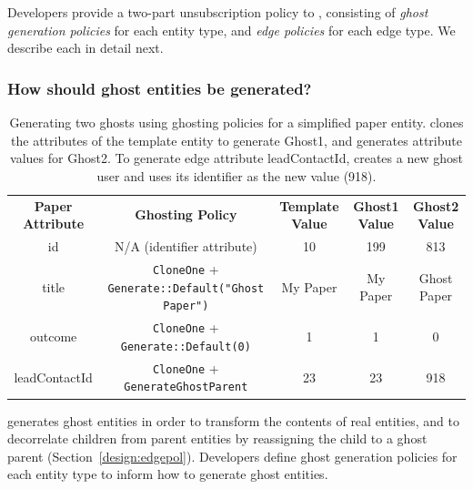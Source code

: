 Developers provide a two-part unsubscription policy to \proto, consisting of \emph{ghost generation policies}
for each entity type, and \emph{edge policies} for each edge type. We describe each in detail next.

\subsubsection{How should ghost entities be generated?}
\label{sec:ghosting}

\begin{table}[t!]
    \centering
    \footnotesize
\begin{tabular}{@{}ccccc@{}}
\textbf{Paper Attribute} & \textbf{Ghosting Policy} & \textbf{Template Value} & \textbf{Ghost1 Value} & \textbf{Ghost2 Value} 
  \\ \cmidrule(r){1-5}
    {id} & N/A (identifier attribute) & 10 & 199 & 813 \\
{title} & \texttt{CloneOne} + \texttt{Generate::Default("Ghost Paper")} & My Paper & My
    Paper & Ghost Paper \\
{outcome} & \texttt{CloneOne} + \texttt{Generate::Default(0)} & 1 & 1 & 0 \\
{leadContactId} & \texttt{CloneOne} + \texttt{GenerateGhostParent} & 23 & 23 & 918 \\
\end{tabular}
    \caption{Generating two ghosts using ghosting policies for a simplified paper entity.
    \proto clones the attributes of the template entity to generate Ghost1, and generates
    attribute values for Ghost2. To generate edge attribute leadContactId, \proto creates a new ghost user and uses its identifier as the new value (918).}
    \label{tab:ghosting}
\end{table}

\proto generates ghost entities in order to transform the contents of real entities, and to
decorrelate children from parent entities by reassigning the child to a ghost parent
(Section~\ref{design:edgepol}). Developers define ghost generation policies for each entity type to
inform \proto how to generate ghost entities.


